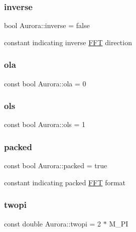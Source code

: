 \subsubsection{\texorpdfstring{inverse}{inverse}}
{\footnotesize\ttfamily bool Aurora\+::inverse = false\hspace{0.3cm}{\ttfamily [static]}}

constant indicating inverse \hyperlink{class_aurora_1_1_f_f_t}{F\+FT} direction \mbox{\label{namespace_aurora_ab2cb0b1f6952bb2ca908ebd8156370db}} 
\subsubsection{\texorpdfstring{ola}{ola}}
{\footnotesize\ttfamily const bool Aurora\+::ola = 0}

\mbox{\label{namespace_aurora_a4e816792565225ccd6ba67110f75fb8b}} 
\subsubsection{\texorpdfstring{ols}{ols}}
{\footnotesize\ttfamily const bool Aurora\+::ols = 1}

\mbox{\label{namespace_aurora_a3e70ffc9ea5c526dcd66b1b14e43f175}} 
\subsubsection{\texorpdfstring{packed}{packed}}
{\footnotesize\ttfamily const bool Aurora\+::packed = true}

constant indicating packed \hyperlink{class_aurora_1_1_f_f_t}{F\+FT} format \mbox{\label{namespace_aurora_a4c08f8416c2b35d5001062f121459b5a}} 
\subsubsection{\texorpdfstring{twopi}{twopi}}
{\footnotesize\ttfamily const double Aurora\+::twopi = 2 $\ast$ M\+\_\+\+PI}

